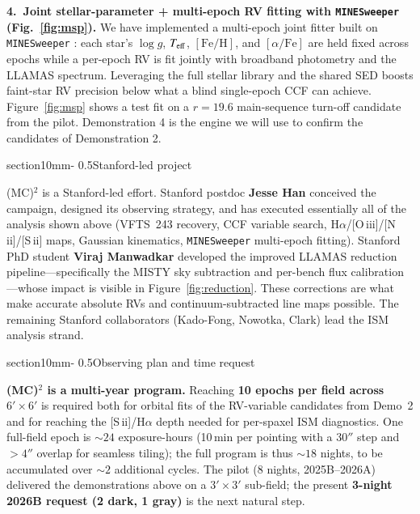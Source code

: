 \documentclass[12pt]{article}
\makeatletter
\renewcommand{\section}{\@startsection%
{section}{1}{0mm}{-\baselineskip}%
{0.5\baselineskip}{\normalfont\large\bfseries}}%
\makeatother
\begin{document}
\noindent\textbf{4.~Joint stellar-parameter + multi-epoch RV fitting with \texttt{MINESweeper} (Fig.~\ref{fig:msp}).} We have implemented a multi-epoch joint fitter built on \texttt{MINESweeper} \citep{cargile2020}: each star's $\log g$, $T_{\rm eff}$, $[\mathrm{Fe}/\mathrm{H}]$, and $[\alpha/\mathrm{Fe}]$ are held fixed across epochs while a per-epoch RV is fit jointly with broadband photometry and the LLAMAS spectrum. Leveraging the full stellar library and the shared SED boosts faint-star RV precision below what a blind single-epoch CCF can achieve. Figure~\ref{fig:msp} shows a test fit on a $r=19.6$ main-sequence turn-off candidate from the pilot. Demonstration 4 is the engine we will use to confirm the candidates of Demonstration 2.

\section{Stanford-led project}

\textsc{\textsf{(MC)$^2$}} is a Stanford-led effort. Stanford postdoc \textbf{Jesse Han} conceived the campaign, designed its observing strategy, and has executed essentially all of the analysis shown above (VFTS~243 recovery, CCF variable search, H$\alpha$/[O\,{\sc iii}]/[N\,{\sc ii}]/[S\,{\sc ii}] maps, Gaussian kinematics, \texttt{MINESweeper} multi-epoch fitting). Stanford PhD student \textbf{Viraj Manwadkar} developed the improved LLAMAS reduction pipeline---specifically the MISTY sky subtraction and per-bench flux calibration---whose impact is visible in Figure~\ref{fig:reduction}. These corrections are what make accurate absolute RVs and continuum-subtracted line maps possible. The remaining Stanford collaborators (Kado-Fong, Nowotka, Clark) lead the ISM analysis strand.

\section{Observing plan and time request}

\textbf{(MC)$^2$ is a multi-year program.} Reaching \textbf{10 epochs per field across $6'\times6'$} is required both for orbital fits of the RV-variable candidates from Demo~2 and for reaching the [S\,{\sc ii}]/H$\alpha$ depth needed for per-spaxel ISM diagnostics. One full-field epoch is $\sim24$ exposure-hours (10\,min per pointing with a $30''$ step and $>4''$ overlap for seamless tiling); the full program is thus $\sim18$ nights, to be accumulated over $\sim2$ additional cycles. The pilot (8 nights, 2025B--2026A) delivered the demonstrations above on a $3'\times3'$ sub-field; the present \textbf{3-night 2026B request (2 dark, 1 gray)} is the next natural step.
\end{document}
